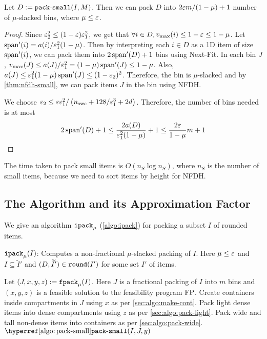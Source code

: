 \begin{lemma}
Let $D := \operatorname{\mathtt{pack-small}}(I, M)$. Then we can pack $D$ into
$2\varepsilon m/(1-\mu) + 1$ number of
$\mu$-slacked bins, where $\mu \le \varepsilon$.
\end{lemma}
\begin{proof}
Since $\varepsilon_2^2 \le (1-\varepsilon)\varepsilon_1^2$, we get that
$\forall i \in D, v_{\max}(i) \le 1-\varepsilon \le 1-\mu$.
Let $\operatorname{span}'(i) = a(i)/\varepsilon_1^2(1-\mu)$. Then by interpreting each $i \in D$ as a 1D item
of size $\operatorname{span}'(i)$, we can pack them into $2\operatorname{span}'(D) + 1$ bins using Next-Fit.
In each bin $J$,
$v_{\max}(J) \le a(J)/\varepsilon_1^2 = (1-\mu)\operatorname{span}'(J) \le 1-\mu$.
Also, $a(J) \le \varepsilon_1^2(1-\mu)\operatorname{span}'(J) \le (1-\varepsilon_2)^2$.
Therefore, the bin is $\mu$-slacked and by \cref{thm:nfdh-small},
we can pack items $J$ in the bin using NFDH.

We choose
$\varepsilon_2 \le \varepsilon\varepsilon_1^2/\left(n_{\mathrm{swc}} + 128/\varepsilon_1^3 + 2d\right)$.
Therefore, the number of bins needed is at most
\[ 2\operatorname{span}'(D) + 1 \le \frac{2a(D)}{\varepsilon_1^2(1-\mu)} + 1
\le \frac{2\varepsilon}{1-\mu} m + 1 \qedhere \]
\end{proof}

The time taken to pack small items is $O(n_S \log n_S)$, where $n_S$ is the
number of small items, because we need to sort items by height for NFDH.

\subsection{The Algorithm and its Approximation Factor}

We give an algorithm $\operatorname{\mathtt{ipack}}_{\mu}$ (\cref{algo:ipack}) for packing a subset $I$ of rounded items.

\begin{algorithm}[htb]
\caption{$\operatorname{\mathtt{ipack}}_{\mu}(I)$: Computes a non-fractional $\mu$-slacked packing of $I$.
Here $\mu \le \varepsilon$ and $I \subseteq \widetilde{I}'$ and $(D, \widetilde{I}') \in \operatorname{\mathtt{round}}(I')$
for some set $I'$ of items.}
\label{algo:ipack}
\begin{algorithmic}[1]
\State Let $(J, x, y, z) := \operatorname{\mathtt{fpack}}_{\mu}(I)$. Here $J$ is a fractional packing of $I$ into $m$ bins
and $(x, y, z)$ is a feasible solution to the feasibility program $\operatorname{FP}$.
\State Create containers inside compartments in $J$ using $x$ as per \cref{sec:algo:make-cont}.
\State Pack light dense items into dense compartments using $z$ as per \cref{sec:algo:pack-light}.
\State Pack wide and tall non-dense items into containers as per \cref{sec:algo:pack-wide}.
\State $\packSmallHyp(I, J, y)$ 
\end{algorithmic}
\end{algorithm}

